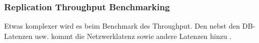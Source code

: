 \begin{flushleft}
    \subsubsection{Replication Throughput Benchmarking}
    Etwas komplexer wird es beim Benchmark des Throughput.
    Den nebst den DB-Latenzen usw. kommt die Netzwerklatenz sowie andere Latenzen hinzu \cite{UU5X5NID}.
\end{flushleft}
